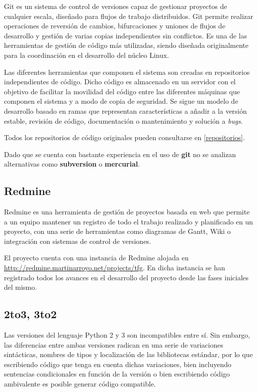 Git es un sistema de control de versiones capaz de gestionar proyectos de cualquier escala, diseñado para flujos de trabajo distribuidos. Git permite realizar operaciones de reversión de cambios, bifurcaciones y uniones de flujos de desarrollo y gestión de varias copias independientes sin conflictos. Es una de las herramientas de gestión de código más utilizadas, siendo diseñada originalmente para la coordinación en el desarrollo del núcleo Linux.

Las diferentes herramientas que componen el sistema son creadas en repositorios independientes de código. Dicho código es almacenado en un servidor con el objetivo de facilitar la movilidad del código entre las diferentes máquinas que componen el sistema y a modo de copia de seguridad. Se sigue un modelo de desarrollo basado en ramas que representan características a añadir a la versión estable, revisión de código, documentación o mantenimiento y solución a \textit{bugs}.

Todos los repositorios de código originales pueden consultarse en \ref{repositorios}.

Dado que se cuenta con bastante experiencia en el uso de \textbf{git} no se analizan alternativas como \textbf{subversion} o \textbf{mercurial}. 

\subsection{Redmine}

Redmine es una herramienta de gestión de proyectos basada en web que permite a un equipo mantener un registro de todo el trabajo realizado y planificado en un proyecto, con una serie de herramientas como diagramas de Gantt, Wiki o integración con sistemas de control de versiones.

El proyecto cuenta con una instancia de Redmine alojada en \href{http://redmine.martinarroyo.net/projects/tfg}{http://redmine.martinarroyo.net/projects/tfg}. En dicha instancia se han registrado todos los avances en el desarrollo del proyecto desde las fases iniciales del mismo.

\subsection{2to3, 3to2}

Las versiones del lenguaje Python 2 y 3 son incompatibles entre sí. Sin embargo, las diferencias entre ambas versiones radican en una serie de variaciones sintácticas, nombres de tipos y localización de las bibliotecas estándar, por lo que escribiendo código que tenga en cuenta dichas variaciones, bien incluyendo sentencias condicionales en función de la versión o bien escribiendo código ambivalente es posible generar código compatible.

